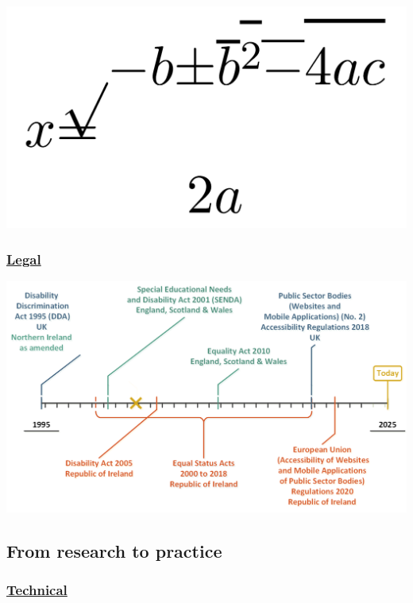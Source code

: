 \documentclass[
  letterpaper,
  DIV=11,
  numbers=noendperiod]{scrartcl}
\begin{document}
\includegraphics{./images/reflowing.png}\\

\subsubsection{\texorpdfstring{\href{./images/alt/Legal-context.xlsx}{Legal}}{Legal}}\label{legal}

\includegraphics{./images/Legal-context.png}\\

\subsection{From research to practice}\label{from-research-to-practice}

\subsubsection{\texorpdfstring{\href{./images/alt/Technology-context.xlsx}{Technical}}{Technical}}\label{technical}
\end{document}
